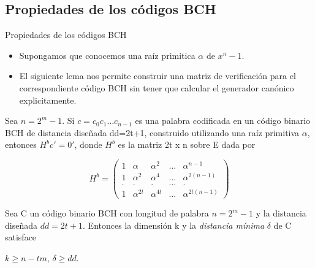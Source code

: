 \subsection{Propiedades de los códigos BCH}

\begin{frame}  {Propiedades de los códigos BCH}\small  

\begin{itemize} 
\item  Supongamos que conocemos una raíz primitica $\alpha$ de $x^n-1$. 

\item El siguiente lema nos permite construir una matriz de verificación para el correspondiente código BCH sin tener que calcular el generador canónico explicitamente. 
\end{itemize} 


\begin{lema}

Sea $n = 2^m -1$. Si $c = c_0c_1\ldots c_{n-1}$ es una palabra codificada en un código binario BCH de distancia diseñada dd=2t+1, construido utilizando una raíz primitiva $\alpha$, entonces $H^bc'=0'$, donde $H^b$ es la matriz 2t x n sobre E dada por 

\[
    H^b =   \left( \begin{array}{ccccccc}
     				  1 &  \alpha  & \alpha^2  & \ldots & \alpha^{n-1}\\ 
					  1 &  \alpha^2  & \alpha^4  & \ldots & \alpha^{2(n-1)}\\ 
					  . & .   & .  & \ldots & .\\ 
					  1 &  \alpha^{2t}  & \alpha^{4t}  & \ldots & \alpha^{2t(n-1)}
           			\end{array}
    		\right) 	    		
\]

\end{lema}
\end{frame} 

\begin{frame}  \small  

\begin{teorema}\label{te:dm}

Sea C un código binario BCH con longitud de palabra $n=2^m -1$ y la distancia diseñada $dd = 2t + 1$. Entonces la dimensión k y la \textit{distancia mínima} $\delta$ de C satisface 

\begin{center}
$k \geq n - tm$,	$\delta \geq dd$.
\end{center}

\end{teorema}
\end{frame} 



